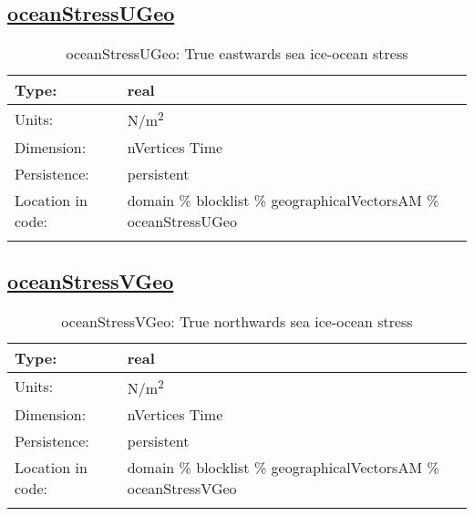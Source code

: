 \subsection[oceanStressUGeo]{\hyperref[sec:var_tab_geographicalVectorsAM]{oceanStressUGeo}}
\label{subsec:var_sec_geographicalVectorsAM_oceanStressUGeo}
\begin{center}
\begin{longtable}{| p{2.0in} | p{4.0in} |}
        \hline 
        Type: & real \\
        \hline 
        Units: & \si{N/m^2} \\
        \hline 
        Dimension: & nVertices Time \\
        \hline 
        Persistence: & persistent \\
        \hline 
         Location in code: & domain \% blocklist \% geographicalVectorsAM \% oceanStressUGeo \\
         \hline 
    \caption{oceanStressUGeo: True eastwards sea ice-ocean stress}
\end{longtable}
\end{center}
\subsection[oceanStressVGeo]{\hyperref[sec:var_tab_geographicalVectorsAM]{oceanStressVGeo}}
\label{subsec:var_sec_geographicalVectorsAM_oceanStressVGeo}
\begin{center}
\begin{longtable}{| p{2.0in} | p{4.0in} |}
        \hline 
        Type: & real \\
        \hline 
        Units: & \si{N/m^2} \\
        \hline 
        Dimension: & nVertices Time \\
        \hline 
        Persistence: & persistent \\
        \hline 
         Location in code: & domain \% blocklist \% geographicalVectorsAM \% oceanStressVGeo \\
         \hline 
    \caption{oceanStressVGeo: True northwards sea ice-ocean stress}
\end{longtable}
\end{center}
